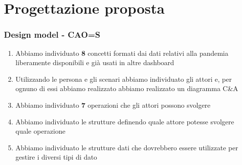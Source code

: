 \documentclass[handout]{beamer}
\begin{document}
	\section{Progettazione proposta}
		\begin{frame}
			\frametitle{Design model - CAO=S}
			\begin{enumerate}[<+->]
				\item Abbiamo individuato \textbf{8} concetti formati dai dati relativi alla pandemia liberamente disponibili e già usati in altre dashboard\\
				\item Utilizzando le persona e gli scenari abbiamo individuato gli attori e, per ognuno di essi abbiamo realizzato abbiamo realizzato un diagramma C\&A\\
				\item Abbiamo individuato \textbf{7} operazioni che gli attori possono svolgere\\
				\item Abbiamo individuato le strutture definendo quale attore potesse svolgere quale operazione\\
				\item Abbiamo individuato le strutture dati che dovrebbero essere utilizzate per gestire i diversi tipi di dato\\
			\end{enumerate}
		\end{frame}
\end{document}
